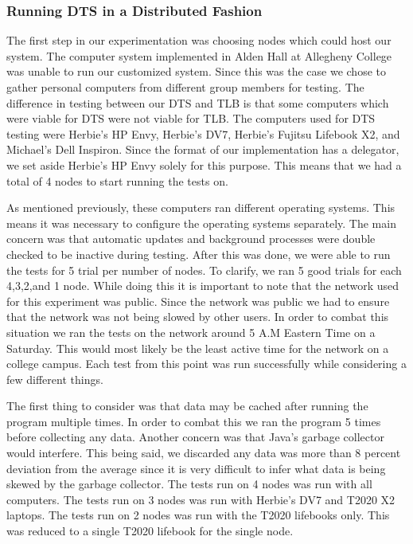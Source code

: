 \documentclass{article}
\begin{document}
{\subsubsection{Running DTS in a Distributed Fashion}
The first step in our experimentation was choosing nodes which could host our system. The computer system implemented in Alden Hall at Allegheny College was unable to run our customized system. Since this was the case we chose to gather personal computers from different group members for testing. The difference in testing between our DTS and TLB is that some computers which were viable for DTS were not viable for TLB. The computers used for DTS testing were Herbie's HP Envy, Herbie's DV7, Herbie's Fujitsu Lifebook X2, and Michael's Dell Inspiron. Since the format of our implementation has a delegator, we set aside Herbie's HP Envy solely for this purpose. This means that we had a total of 4 nodes to start running the tests on.

 As mentioned previously, these computers ran different operating systems. This means it was necessary to configure the operating systems separately. The main concern was that automatic updates and background processes were double checked to be inactive during testing. After this was done, we were able to run the tests for 5 trial per number of nodes. To clarify, we ran 5 good trials for each 4,3,2,and 1 node. While doing this it is important to note that the network used for this experiment was public. Since the network was public we had to ensure that the network was not being slowed by other users. In order to combat this situation we ran the tests on the network around 5 A.M Eastern Time on a Saturday. This would most likely be the least active time for the network on a college campus. Each test from this point was run successfully while considering a few different things.
 
 The first thing to consider was that data may be cached after running the program multiple times. In order to combat this we ran the program 5 times before collecting any data. Another concern was that Java's garbage collector would interfere. This being said, we discarded any data was more than 8 percent deviation from the average since it is very difficult to infer what data is being skewed by the garbage collector. The tests run on 4 nodes was run with all computers. The tests run on 3 nodes was run with Herbie's DV7 and T2020 X2 laptops. The tests run on 2 nodes was run with the T2020 lifebooks only. This was reduced to a single T2020 lifebook for the single node.
 
}
\end{document}

